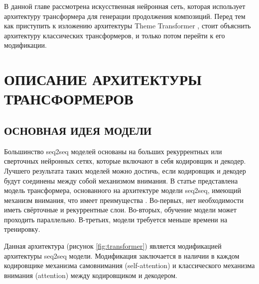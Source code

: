 В данной главе рассмотрена искусственная нейронная сеть, которая использует архитектуру трансформера для генерации продолжения композиций.
Перед тем как приступить к изложению архитектуры Theme Transformer \cite{theme}, стоит объяснить архитектуру классических трансформеров, и только потом перейти к его модификации.

\section{ОПИСАНИЕ АРХИТЕКТУРЫ ТРАНСФОРМЕРОВ}
\subsection{ОСНОВНАЯ ИДЕЯ МОДЕЛИ}
    Большинство seq2seq моделей основаны на больших рекуррентных или сверточных нейронных сетях, которые включают в себя кодировщик и декодер. Лучшего результата таких моделей можно достичь, если кодировщик и декодер будут соединены между собой механизмом внимания. В статье представлена модель трансформера, основанного на архитектуре модели seq2seq, имеющий механизм внимания, что имеет преимущества \cite{attention}. Во-первых, нет необходимости иметь свёрточные и рекуррентные слои. Во-вторых, обучение модели может проходить параллельно. В-третьих, модели требуется меньше времени на тренировку.
    
    Данная архитектура (рисунок \ref{fig:transformer}) является модификацией архитектуры seq2seq модели. Модификация заключается в наличии в каждом кодировщике механизма самовнимания (self-attention) и классического механизма внимания (attention) между кодировщиком и декодером.
    
